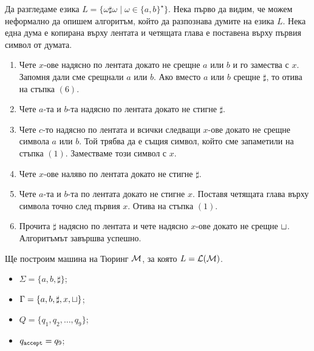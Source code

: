 \begin{example}
  Да разгледаме езика $L = \{\omega \sharp \omega \mid \omega\in\{a,b\}^\star\}$.
  Нека първо да видим, че можем неформално да опишем алгоритъм, който да разпознава думите на езика $L$.
  Нека една дума е копирана върху лентата и четящата глава е поставена върху първия символ от думата.
  \begin{enumerate}[(1)]
  \item 
    Чете $x$-ове надясно по лентата докато не срещне $a$ или $b$ и го замества с $x$.
    Запомня дали сме срещнали $a$ или $b$.
    Ако вместо $a$ или $b$ срещне $\sharp$, то отива на стъпка $(6)$.
  \item
    Чете $a$-та и $b$-та надясно по лентата докато не стигне $\sharp$. 
  \item
    Чете $c$-то надясно по лентата и всички следващи $x$-ове докато не срещне символа $a$ или $b$.
    Той трябва да е същия символ, който сме запаметили на стъпка $(1)$.
    Заместваме този символ с $x$.
  \item
    Чете $x$-ове наляво по лентата докато не стигне $\sharp$.
  \item
    Чете $a$-та и $b$-та по лентата докато не стигне $x$.
    Поставя четящата глава върху символа точно след първия $x$.
    Отива на стъпка $(1)$.
  \item
    Прочита $\sharp$ надясно по лентата и чете надясно $x$-ове докато не срещне $\sqcup$.
    Алгоритъмът завършва успешно.
  \end{enumerate}

  Ще построим машина на Тюринг $\mathcal{M}$, за която $L = \mathcal{L}(\mathcal{M})$.
  \begin{itemize}
  \item 
    $\Sigma = \{a,b,\sharp\}$;
  \item
    $\Gamma = \{a,b,\sharp,x,\sqcup\}$;
  \item
    $Q = \{q_1,q_2,\dots,q_9\}$;
  \item
    $q_{\texttt{accept}} = q_9$;
  \end{itemize}

  \begin{framed}
  \begin{figure}[H]
    \begin{center}
\end{center}
\end{figure}
\end{framed}
\end{example}

